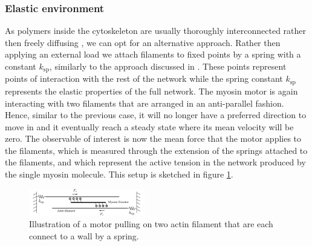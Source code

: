 \documentclass[aps,pre,twocolumn,showpacs,showkeys,superscriptaddress,floatfix]{revtex4-1}
\begin{document}
\subsubsection{Elastic environment}
\label{sec:environment}
As polymers inside the cytoskeleton are usually thoroughly interconnected rather then freely diffusing \cite{blanchoin2014actin,ennomani2016architecture},
we can opt for an alternative approach.
Rather then applying an external load we attach filaments to fixed points by a spring with a constant $k_\text{sp}$, 
similarly to the approach discussed in \cite{albert2014stochastic}. 
These points represent points of interaction with the rest of the network while the spring constant $k_\text{sp}$ represents the elastic properties of the full network. 
The myosin motor is again interacting with two filaments that are arranged in an anti-parallel fashion. 
Hence, similar to the previous case, it will no longer have a preferred direction to move in and 
it eventually reach a steady state where its mean velocity will be zero. 
The observable of interest is now the mean force that the motor applies to the filaments, 
which is measured through the extension of the springs attached to the filaments,
and which represent the active tension in the network produced by the single myosin molecule. 
This setup is sketched in figure \ref{fig:tug}. 
\begin{figure}[t]
\centering
\includegraphics[width=0.45\textwidth,height=!]{tug}
\caption{
\label{fig:tug}
Illustration of a motor pulling on two actin filament that are each connect to a wall by a spring.
}
\end{figure}
\end{document}
